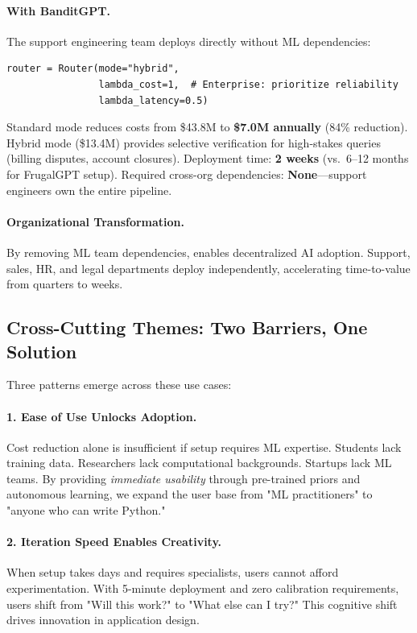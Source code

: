 \paragraph{With BanditGPT.} The support engineering team deploys directly without ML dependencies:

\begin{verbatim}
router = Router(mode="hybrid", 
                lambda_cost=1,  # Enterprise: prioritize reliability
                lambda_latency=0.5)
\end{verbatim}

Standard mode reduces costs from \$43.8M to \textbf{\$7.0M annually} (84\% reduction). Hybrid mode (\$13.4M) provides selective verification for high-stakes queries (billing disputes, account closures). Deployment time: \textbf{2 weeks} (vs.\ 6--12 months for FrugalGPT setup). Required cross-org dependencies: \textbf{None}---support engineers own the entire pipeline.

\paragraph{Organizational Transformation.} By removing ML team dependencies, \ours{} enables decentralized AI adoption. Support, sales, HR, and legal departments deploy independently, accelerating time-to-value from quarters to weeks.

\subsection{Cross-Cutting Themes: Two Barriers, One Solution}

Three patterns emerge across these use cases:

\paragraph{1. Ease of Use Unlocks Adoption.}
Cost reduction alone is insufficient if setup requires ML expertise. Students lack training data. Researchers lack computational backgrounds. Startups lack ML teams. By providing \emph{immediate usability} through pre-trained priors and autonomous learning, we expand the user base from "ML practitioners" to "anyone who can write Python."

\paragraph{2. Iteration Speed Enables Creativity.}
When setup takes days and requires specialists, users cannot afford experimentation. With 5-minute deployment and zero calibration requirements, users shift from "Will this work?" to "What else can I try?" This cognitive shift drives innovation in application design.

